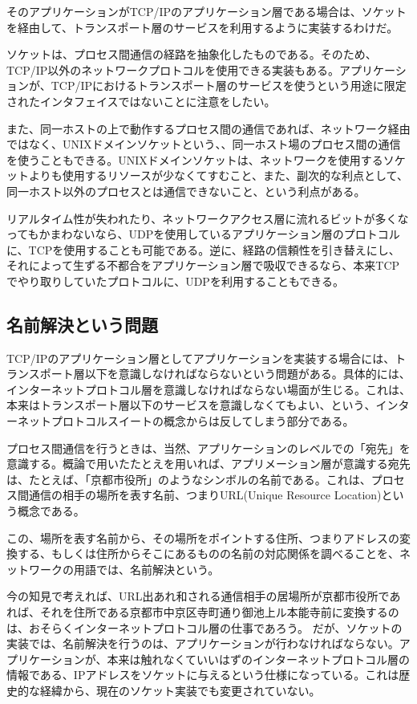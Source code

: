 そのアプリケーションがTCP/IPのアプリケーション層である場合は、ソケットを経由して、トランスポート層のサービスを利用するように実装するわけだ。

ソケットは、プロセス間通信の経路を抽象化したものである。そのため、TCP/IP以外のネットワークプロトコルを使用できる実装もある。アプリケーションが、TCP/IPにおけるトランスポート層のサービスを使うという用途に限定されたインタフェイスではないことに注意をしたい。

また、同一ホストの上で動作するプロセス間の通信であれば、ネットワーク経由ではなく、UNIXドメインソケットという、、同一ホスト場のプロセス間の通信を使うこともできる。UNIXドメインソケットは、ネットワークを使用するソケットよりも使用するリソースが少なくてすむこと、また、副次的な利点として、同一ホスト以外のプロセスとは通信できないこと、という利点がある。

リアルタイム性が失われたり、ネットワークアクセス層に流れるビットが多くなってもかまわないなら、UDPを使用しているアプリケーション層のプロトコルに、TCPを使用することも可能である。逆に、経路の信頼性を引き替えにし、それによって生ずる不都合をアプリケーション層で吸収できるなら、本来TCPでやり取りしていたプロトコルに、UDPを利用することもできる。

\subsection{名前解決という問題}
TCP/IPのアプリケーション層としてアプリケーションを実装する場合には、トランスポート層以下を意識しなければならないという問題がある。具体的には、インターネットプロトコル層を意識しなければならない場面が生じる。これは、本来はトランスポート層以下のサービスを意識しなくてもよい、という、インターネットプロトコルスイートの概念からは反してしまう部分である。

プロセス間通信を行うときは、当然、アプリケーションのレベルでの「宛先」を意識する。概論で用いたたとえを用いれば、アプリメーション層が意識する宛先は、たとえば、「京都市役所」のようなシンボルの名前である。これは、プロセス間通信の相手の場所を表す名前、つまりURL(Unique Resource Location)という概念である。

この、場所を表す名前から、その場所をポイントする住所、つまりアドレスの変換する、もしくは住所からそこにあるものの名前の対応関係を調べることを、ネットワークの用語では、名前解決という。

今の知見で考えれば、URL出あれ和される通信相手の居場所が京都市役所であれば、それを住所である京都市中京区寺町通り御池上ル本能寺前に変換するのは、おそらくインターネットプロトコル層の仕事であろう。
だが、ソケットの実装では、名前解決を行うのは、アプリケーションが行わなければならない。アプリケーションが、本来は触れなくていいはずのインターネットプロトコル層の情報である、IPアドレスをソケットに与えるという仕様になっている。これは歴史的な経緯から、現在のソケット実装でも変更されていない。


